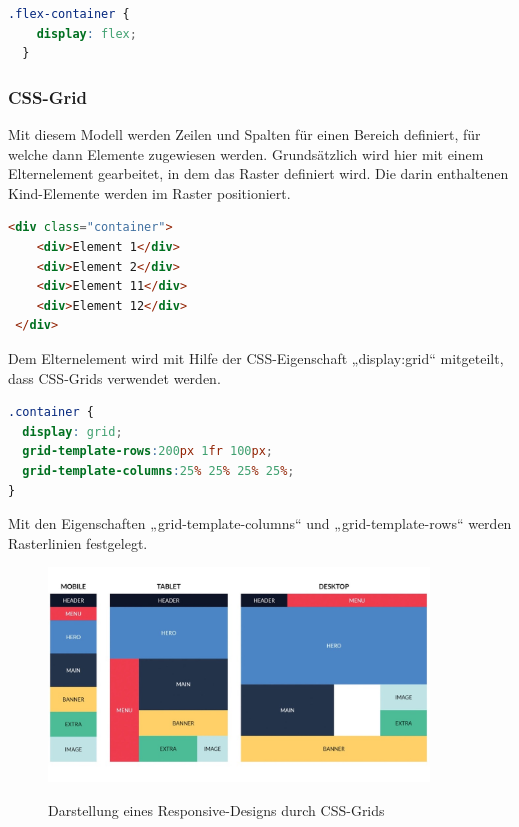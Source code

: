 \begin{lstlisting}[language=CSS, caption=CSS-Code zur Aktivierung der Flexbox, label=lst:impl:flexCSS]
  .flex-container {
    display: flex;
  }
\end{lstlisting} \cite{flexbox}

\subsubsection{CSS-Grid}

Mit diesem Modell werden Zeilen und Spalten für einen Bereich definiert, für welche dann Elemente zugewiesen werden. Grundsätzlich wird hier mit einem Elternelement gearbeitet, in dem das Raster definiert wird. Die darin enthaltenen Kind-Elemente werden im Raster positioniert.
\cite{cssgrid}

\newpage

\begin{lstlisting}[language=HTML, caption=HTML-Code vom Aufbau eines Grids, label=lst:impl:gridHTML]
  <div class="container"> 
    <div>Element 1</div> 
    <div>Element 2</div> 
    <div>Element 11</div> 
    <div>Element 12</div> 
 </div>
\end{lstlisting} \cite{cssgrid}

Dem Elternelement wird mit Hilfe der CSS-Eigenschaft „display:grid“ mitgeteilt, dass CSS-Grids verwendet werden.

\begin{lstlisting}[language=CSS, caption=CSS-Code zur Aktivierung des Grids, label=lst:impl:gridCSS]
.container { 
  display: grid; 
  grid-template-rows:200px 1fr 100px; 
  grid-template-columns:25% 25% 25% 25%; 
}
\end{lstlisting} \cite{cssgrid}

Mit den Eigenschaften „grid-template-columns“ und „grid-template-rows“ werden Rasterlinien festgelegt.
\cite{cssgrid}

\begin{figure}[H]
  \centering
  \includegraphics[width=0.9\textwidth]{pics/cssGridDarstellung.jpg}
  \caption{Darstellung eines Responsive-Designs durch CSS-Grids}
  \cite{cssgridDarstellung}
\end{figure}

